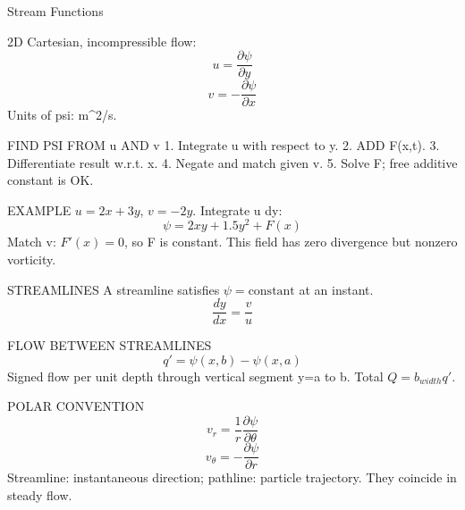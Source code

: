 Stream Functions

2D Cartesian, incompressible flow:
$$u=\frac{\partial\psi}{\partial y}$$
$$v=-\frac{\partial\psi}{\partial x}$$
Units of psi: m^2/s.

FIND PSI FROM u AND v
1. Integrate u with respect to y.
2. ADD F(x,t).
3. Differentiate result w.r.t. x.
4. Negate and match given v.
5. Solve F; free additive constant is OK.

EXAMPLE
$u=2x+3y$, $v=-2y$.
Integrate u dy:
$$\psi=2xy+1.5y^2+F(x)$$
Match v: $F'(x)=0$, so F is constant.
This field has zero divergence but nonzero vorticity.

STREAMLINES
A streamline satisfies $\psi=\text{constant}$ at an instant.
$$\frac{dy}{dx}=\frac{v}{u}$$

FLOW BETWEEN STREAMLINES
$$q'=\psi(x,b)-\psi(x,a)$$
Signed flow per unit depth through vertical segment y=a to b. Total $Q=b_{width}q'$.

POLAR CONVENTION
$$v_r=\frac{1}{r}\frac{\partial\psi}{\partial\theta}$$
$$v_\theta=-\frac{\partial\psi}{\partial r}$$
Streamline: instantaneous direction; pathline: particle trajectory. They coincide in steady flow.
